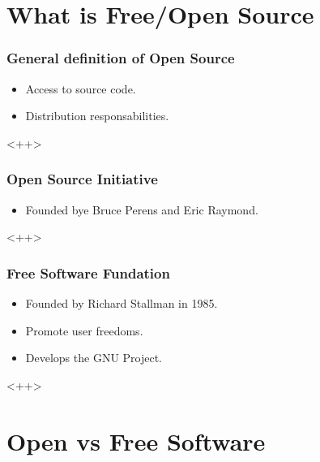 \documentclass[hyperref={pdfpagelabels=false},xcolor=pst,pdf,fragile]{beamer}
\title{\Title}
\author{\Author\\ \Matricula}
\date{\today}
\begin{document}
\maketitle



\section{What is Free/Open Source}

\begin{frame}
  \frametitle{General definition of Open Source}

  \begin{itemize}
	\item Access to source code.
	\item Distribution responsabilities.
  \end{itemize}<++>

\end{frame}

\begin{frame}
  \frametitle{Open Source Initiative}

  \begin{itemize}
	\item Founded bye Bruce Perens and Eric Raymond.
  \end{itemize}<++>

\end{frame}

\begin{frame}
  \frametitle{Free Software Fundation}

  \begin{itemize}
	\item Founded by Richard Stallman in 1985.
	\item Promote user freedoms.
	\item Develops the GNU Project.
  \end{itemize}<++>

\end{frame}

\section{Open vs Free Software}
\end{document}
